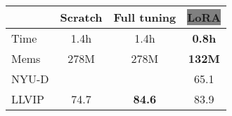 \documentclass{article} \usepackage{iclr2024_conference,times}
\begin{document}
\begin{table*}[h]
{\begin{minipage}{0.4\linewidth}
{\begin{center}
                    \begin{tabular}{lccc}
                        \toprule
                         & Scratch & Full tuning & \colorbox{Gray}{LoRA} \\ 
                        \midrule
                        Time & 1.4h & 1.4h & \textbf{0.8h} \\ 
                        Mems & 278M & 278M & \textbf{132M} \\ 
                        NYU-D &  & \textbf{} & 65.1 \\ 
                        LLVIP & 74.7 & \textbf{84.6} & 83.9 \\ 
\bottomrule
                    \end{tabular}
		\end{center}}\end{minipage}
	}
 

\end{table*}
\end{document}
